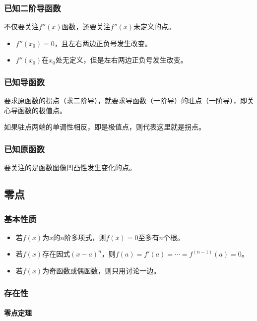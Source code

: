 \subsubsection{已知二阶导函数}

不仅要关注$f''(x)$函数，还要关注$f''(x)$未定义的点。

\begin{itemize}
    \item $f''(x_0)=0$，且左右两边正负号发生改变。
    \item $f''(x_0)$在$x_0$处无定义，但是左右两边正负号发生改变。
\end{itemize}

\subsubsection{已知导函数}

要求原函数的拐点（求二阶导），就要求导函数（一阶导）的驻点（一阶导），即关心导函数的极值点。

如果驻点两端的单调性相反，即是极值点，则代表这里就是拐点。

\subsubsection{已知原函数}

要关注的是函数图像凹凸性发生变化的点。

\subsection{零点}

\subsubsection{基本性质}

\begin{itemize}
    \item 若$f(x)$为$x$的$n$阶多项式，则$f(x)=0$至多有$n$个根。
    \item 若$f(x)$存在因式$(x-a)^n$，则$f(a)=f'(a)=\cdots=f^{(n-1)}(a)=0$。
    \item 若$f(x)$为奇函数或偶函数，则只用讨论一边。
\end{itemize}

\subsubsection{存在性}

\paragraph{零点定理} \leavevmode \medskip

